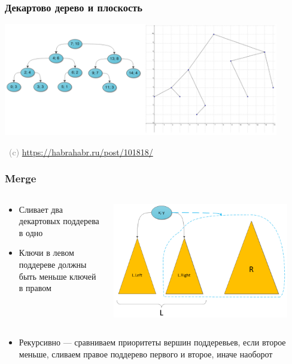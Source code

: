 \documentclass[xetex,mathserif,serif]{beamer}
\newcommand{\attribution}[1] {
	\vspace{-5mm}\begin{flushright}\begin{scriptsize}\textcolor{gray}{\textcopyright\, #1}\end{scriptsize}\end{flushright}
}
\begin{document}
	\begin{frame}
		\frametitle{Декартово дерево и плоскость}
		\begin{center}
			\includegraphics[width=0.9\textwidth]{treap-and-plain.png}
			\attribution{(c) \url{https://habrahabr.ru/post/101818/}}
		\end{center}
	\end{frame}

	\begin{frame}
		\frametitle{Merge}
		\begin{columns}
			\begin{column}{0.3\textwidth}
				\begin{itemize}
					\item Сливает два декартовых поддерева в одно
					\item Ключи в левом поддереве должны быть меньше ключей в правом
				\end{itemize}
			\end{column}
			\begin{column}{0.7\textwidth}
				\begin{center}
					\includegraphics[width=0.9\textwidth]{treap-merge.png}
				\end{center}
			\end{column}
		\end{columns}
		\begin{itemize}
			\item Рекурсивно --- сравниваем приоритеты вершин поддеревьев, если второе меньше, сливаем правое поддерево первого и второе, иначе наоборот
		\end{itemize}
	\end{frame}
\end{document}
